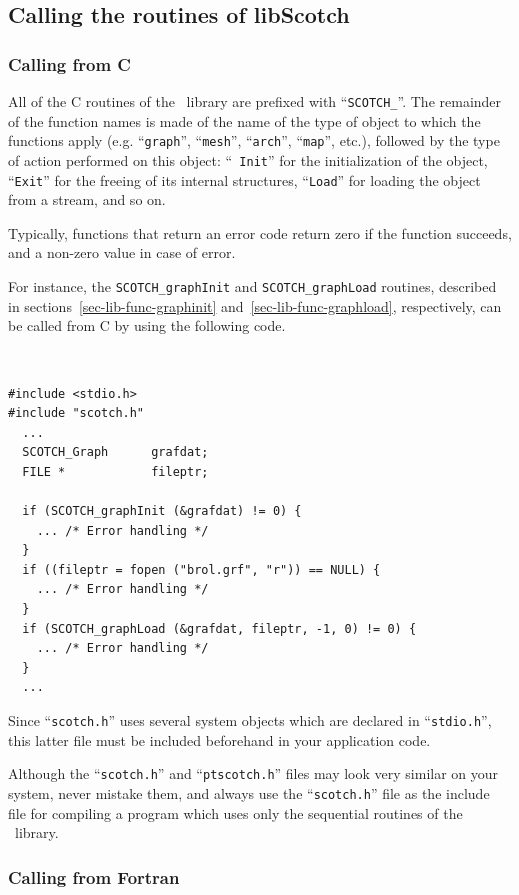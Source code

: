\subsection{Calling the routines of {\sc libScotch}}

\subsubsection{Calling from C}

All of the C routines of the \libscotch\ library are prefixed with
``{\tt SCOTCH\_}''. The remainder of the function names is made of the
name of the type of object to which the functions apply (e\@.g\@.
``{\tt graph}'', ``{\tt mesh}'', ``{\tt arch}'', ``{\tt map}'', etc.),
followed by the type of action performed on this object: ``{\tt
Init}'' for the initialization of the object, ``{\tt Exit}'' for the
freeing of its internal structures, ``{\tt Load}'' for loading the
object from a stream, and so on.

Typically, functions that return an error code return zero if the
function succeeds, and a non-zero value in case of error.

For instance, the {\tt SCOTCH\_\lbt graph\lbt Init} and
{\tt SCOTCH\_\lbt graph\lbt Load} routines, described in
sections~\ref{sec-lib-func-graphinit}
and~\ref{sec-lib-func-graphload}, respectively, can
be called from C by using the following code.
{\tt
\begin{verbatim}
#include <stdio.h>
#include "scotch.h"
  ...
  SCOTCH_Graph      grafdat;
  FILE *            fileptr;

  if (SCOTCH_graphInit (&grafdat) != 0) {
    ... /* Error handling */
  }
  if ((fileptr = fopen ("brol.grf", "r")) == NULL) {
    ... /* Error handling */
  }
  if (SCOTCH_graphLoad (&grafdat, fileptr, -1, 0) != 0) {
    ... /* Error handling */
  }
  ...
\end{verbatim}
}

Since ``{\tt scotch.h}'' uses several system objects which are
declared in ``{\tt stdio.h}'', this latter file must be
included beforehand in your application code.

Although the ``{\tt scotch.h}'' and ``{\tt ptscotch.h}'' files may
look very similar on your system, never mistake them, and always use
the ``{\tt scotch.h}'' file as the include file for compiling a
program which uses only the sequential routines of the \libscotch\
library.

\subsubsection{Calling from Fortran}

